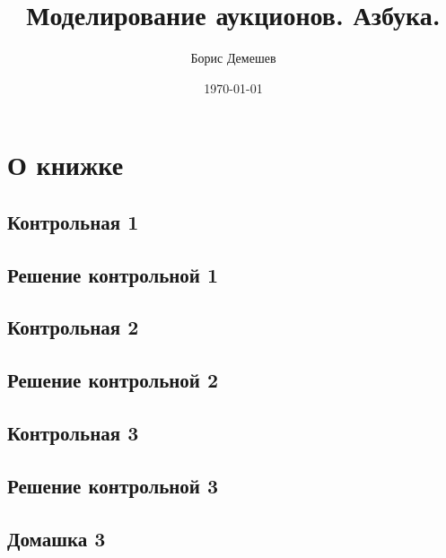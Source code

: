 \documentclass[11pt, openany]{book}
\title{Моделирование аукционов. Азбука. }
\author{Борис Демешев}
\date{\today}
\numberwithin{equation}{page} %
\theoremstyle{definition} %
\theoremstyle{definition}
\theoremstyle{definition}
\begin{document}
\maketitle
\tableofcontents{}

\chapter{О книжке}



\section{Контрольная 1}



\section{Решение контрольной 1}






\section{Контрольная 2}



\section{Решение контрольной 2}





\section{Контрольная 3}



\section{Решение контрольной 3}



\section{Домашка 3}
\end{document}
